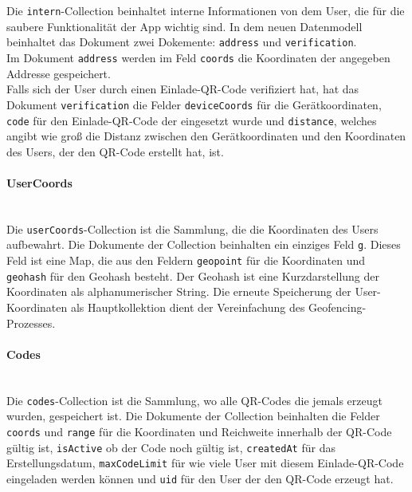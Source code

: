\\\\
Die \texttt{intern}-Collection beinhaltet interne Informationen von dem User, die für die saubere Funktionalität der App wichtig sind. In dem neuen Datenmodell beinhaltet das Dokument zwei Dokemente: \texttt{address} und \texttt{verification}.
\\
Im Dokument \texttt{address} werden im Feld \texttt{coords} die Koordinaten der angegeben Addresse gespeichert.
\\
Falls sich der User durch einen Einlade-QR-Code verifiziert hat, hat das Dokument \texttt{verification} die Felder \texttt{deviceCoords} für die Gerätkoordinaten, \texttt{code} für den Einlade-QR-Code der eingesetzt wurde und \texttt{distance}, welches angibt wie groß die Distanz zwischen den Gerätkoordinaten und den Koordinaten des Users, der den QR-Code erstellt hat, ist.

\paragraph{UserCoords}\mbox{} \\
Die \texttt{userCoords}-Collection ist die Sammlung, die die Koordinaten des Users aufbewahrt. Die Dokumente der Collection beinhalten ein einziges Feld \texttt{g}. Dieses Feld ist eine Map, die aus den Feldern \texttt{geopoint} für die Koordinaten und \texttt{geohash} für den Geohash besteht. Der Geohash ist eine Kurzdarstellung der Koordinaten als alphanumerischer String. Die erneute Speicherung der User-Koordinaten als Hauptkollektion dient der Vereinfachung des Geofencing-Prozesses.

\paragraph{Codes}\mbox{} \\
Die \texttt{codes}-Collection ist die Sammlung, wo alle QR-Codes die jemals erzeugt wurden, gespeichert ist. Die Dokumente der Collection beinhalten die Felder \texttt{coords} und \texttt{range} für die Koordinaten und Reichweite innerhalb der QR-Code gültig ist, \texttt{isActive} ob der Code noch gültig ist, \texttt{createdAt} für das Erstellungsdatum, \texttt{maxCodeLimit} für wie viele User mit diesem Einlade-QR-Code eingeladen werden können und \texttt{uid} für den User der den QR-Code erzeugt hat.

